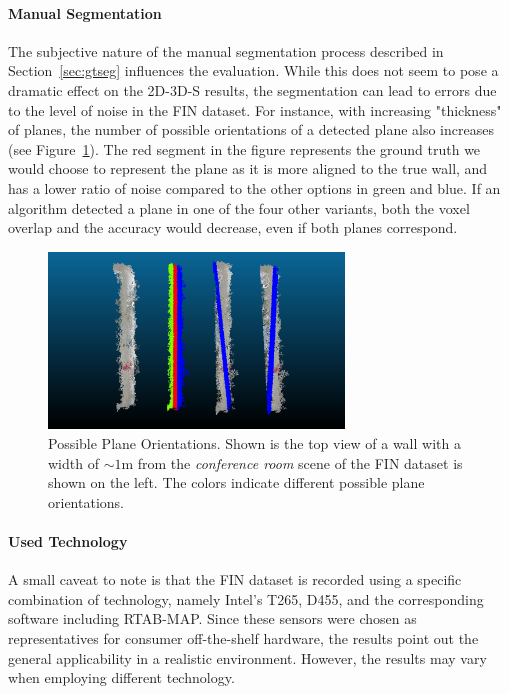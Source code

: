 \documentclass[main.tex]{subfiles}
\begin{document}
\paragraph{Manual Segmentation}
The subjective nature of the manual segmentation process described in Section~\ref{sec:gtseg} influences the evaluation. While this does not seem to pose a dramatic effect on the 2D-3D-S results, the segmentation can lead to errors due to the level of noise in the FIN dataset. For instance, with increasing "thickness" of planes, the number of possible orientations of a detected plane also increases (see Figure~\ref{fig:poss-planes}). The red segment in the figure represents the ground truth we would choose to represent the plane as it is more aligned to the true wall, and has a lower ratio of noise compared to the other options in green and blue. If an algorithm detected a plane in one of the four other variants, both the voxel overlap and the accuracy would decrease, even if both planes correspond.

\begin{figure}[]
    \centering
    \includegraphics[width=0.7\textwidth]{images/possible_planes.png}
    \caption[Plane Orientation Ambiguity]{Possible Plane Orientations. Shown is the top view of a wall with a width of ${\sim}1$m from the \textit{conference room} scene of the FIN dataset is shown on the left. The colors indicate different possible plane orientations.}
    \label{fig:poss-planes}
\end{figure}


\paragraph{Used Technology}
A small caveat to note is that the FIN dataset is recorded using a specific combination of technology, namely Intel's T265, D455, and the corresponding software including RTAB-MAP.
Since these sensors were chosen as representatives for consumer off-the-shelf hardware, the results point out the general applicability in a realistic environment. However, the results may vary when employing different technology. 
\end{document}
